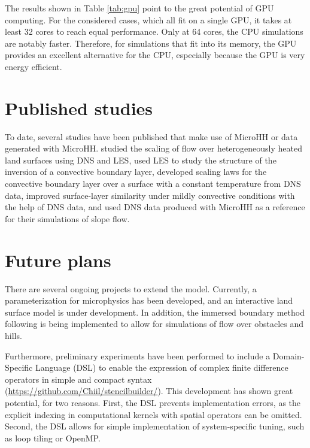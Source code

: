 \documentclass[gmd,manuscript]{copernicus}
\begin{document}
The results shown in Table \ref{tab:gpu} point to the great potential of GPU computing. For the considered cases, which all fit on a single GPU, it takes at least 32 cores to reach equal performance. Only at 64 cores, the CPU simulations are notably faster. Therefore, for simulations that fit into its memory, the GPU provides an excellent alternative for the CPU, especially because the GPU is very energy efficient.

\section{Published studies}\label{sec:published}
To date, several studies have been published that make use of MicroHH or data generated with MicroHH.  studied the scaling of flow over heterogeneously heated land surfaces using DNS and LES, \citet{Gentine2015} used LES to study the structure of the inversion of a convective boundary layer, \citet{vanHeerwaarden2016} developed scaling laws for the convective boundary layer over a surface with a constant temperature from DNS data, \citet{McColl2017} improved surface-layer similarity under mildly convective conditions with the help of DNS data, and \citet{Umphrey2017} used DNS data produced with MicroHH as a reference for their simulations of slope flow.

\section{Future plans}\label{sec:future}
There are several ongoing projects to extend the model. Currently, a parameterization for microphysics has been developed, and an interactive land surface model is under development. In addition, the immersed boundary method following \citet{Tseng2003} is being implemented to allow for simulations of flow over obstacles and hills.

Furthermore, preliminary experiments have been performed to include a Domain-Specific Language (DSL) to enable the expression of complex finite difference operators in simple and compact syntax (\url{https://github.com/Chiil/stencilbuilder/}). This development has shown great potential, for two reasons. First, the DSL prevents implementation errors, as the explicit indexing in computational kernels with spatial operators can be omitted. Second, the DSL allows for simple implementation of system-specific tuning, such as loop tiling or OpenMP.
\end{document}
